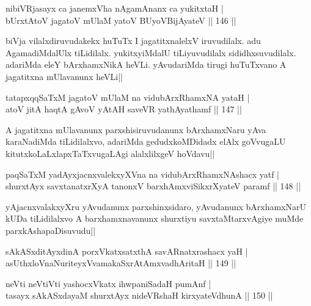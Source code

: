 
\begin{shl}
nibiVRjasayx ca janemxVha nA\s \s gamAnanx ca yukitxtaH |\\
bUrxtAtoV jagatoV mUlaM yatoV BUyoV\s BijAyateV \hfill || 146 ||
\end{shl}

\begin{artha}
biVja vilalxdiruvudakekx huTuTx I jagatitxnalelxV iruvudilalx. adu AgamadiMdalUlx tiLidilalx. yukitxyiMdalU tiLiyuvudilalx sididhxsuvudilalx. adariMda eleY bArxhamxNikA heVLi. yAvudariMda tirugi huTuTxvano A jagatitxna mUlavanunx heVLi||
\end{artha}

\begin{shl}
tatapxqqSaTxM jagatoV mUlaM na vidubArxRhamxNA yataH |\\
atoV jitA haqtA gAvoV yAtAH saveVR yathAyathamf \hfill || 147 ||
\end{shl}

\begin{artha}
A jagatitxna mUlavanunx parxshisiruvudanunx bArxhamxNaru yAva karaNadiMda tiLidilalxvo, adariMda gedudxkoMDidadx elAlx goVvugaLU kitutxkoLaLxlapxTaTxvugaLAgi alalxlilxgeV hoVdavu||
\end{artha}

\begin{shl}
paqSaTxM yadAyxjacnxvalekxyXVna na vidubArxRhamxNAshacx yatf |\\
shurxtAyx savxtanatxrXyA tanonxV barxhAmx\s \s viSikxrXyateV paramf \hfill || 148 ||
\end{shl}

\begin{artha}%
yAjacnxvalakxyXru yAvudanunx parxshinxsidaro, yAvudanunx bArxhamxNarU kUDa tiLidilalxvo A barxhamxnavanunx shurxtiyu savxtaMtarxvAgiye muMde parxkAshapaDisuvudu||
\end{artha}

\begin{shl}
sAkASxditAyxdinA porxVkatxsatxthA savARnatxrashacx yaH |\\
asUthxloV\s naNuriteyxVvamakaSxrAtAmx\s vadhAritaH \hfill || 149 ||
\end{shl}

\begin{shl}
neVti neVtiVti yashocxVkatx ihwpaniSadaH pumAnf |\\
tasayx sAkASxdayaM shurxtAyx nideVRshaH kirxyateV\s dhunA \hfill || 150 ||
\end{shl}

